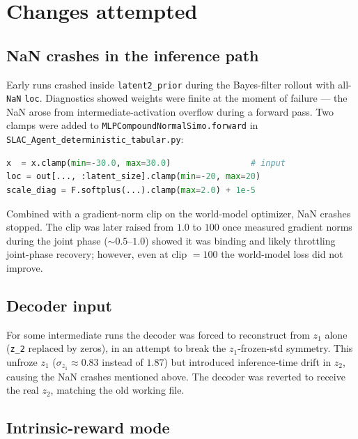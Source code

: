 \documentclass[11pt,a4paper]{article}
\begin{document}
\section{Changes attempted}

\subsection{NaN crashes in the inference path}

Early runs crashed inside \texttt{latent2\_prior} during the Bayes-filter
rollout with all-\texttt{NaN} \texttt{loc}. Diagnostics showed weights were
finite at the moment of failure --- the NaN arose from intermediate-activation
overflow during a forward pass. Two clamps were added to
\texttt{MLPCompoundNormalSimo.forward} in
\texttt{SLAC\_Agent\_deterministic\_tabular.py}:
\begin{lstlisting}[language=Python]
x  = x.clamp(min=-30.0, max=30.0)                # input
loc = out[..., :latent_size].clamp(min=-20, max=20)
scale_diag = F.softplus(...).clamp(max=2.0) + 1e-5
\end{lstlisting}
Combined with a gradient-norm clip on the world-model optimizer, NaN crashes
stopped. The clip was later raised from $1.0$ to $100$ once measured
gradient norms during the joint phase ($\sim 0.5$--$1.0$) showed it was
binding and likely throttling joint-phase recovery; however, even at clip
$=100$ the world-model loss did not improve.

\subsection{Decoder input}

For some intermediate runs the decoder was forced to reconstruct from $z_1$
alone (\texttt{z\_2} replaced by zeros), in an attempt to break the
$z_1$-frozen-std symmetry. This unfroze $z_1$
($\sigma_{z_1} \approx 0.83$ instead of $1.87$) but introduced inference-time
drift in $z_2$, causing the NaN crashes mentioned above. The decoder was
reverted to receive the real $z_2$, matching the old working file.

\subsection{Intrinsic-reward mode}
\end{document}
